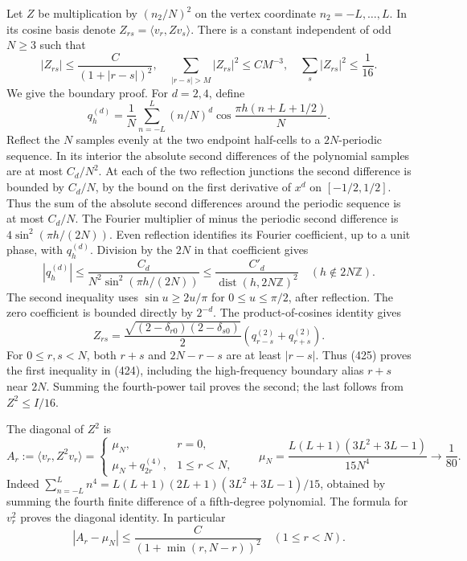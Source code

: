 \documentclass[
  11pt,
]{article}
\begin{document}
Let \(Z\) be multiplication by \((n_2/N)^2\) on the vertex coordinate
\(n_2=-L,\ldots,L\). In its cosine basis denote
\(Z_{rs}=\langle v_r,Zv_s\rangle\). There is a constant independent of
odd \(N\ge3\) such that \[
 |Z_{rs}|\le\frac{C}{(1+|r-s|)^2},
 \quad \sum_{|r-s|>M}|Z_{rs}|^2\le CM^{-3},
 \quad \sum_s|Z_{rs}|^2\le\frac1{16}.
 \tag{424}
\] We give the boundary proof. For \(d=2,4\), define \[
 q^{(d)}_h=\frac1N\sum_{n=-L}^L
       (n/N)^d\cos\frac{\pi h(n+L+1/2)}N .
\] Reflect the \(N\) samples evenly at the two endpoint half-cells to a
\(2N\)-periodic sequence. In its interior the absolute second
differences of the polynomial samples are at most \(C_d/N^2\). At each
of the two reflection junctions the second difference is bounded by
\(C_d/N\), by the bound on the first derivative of \(x^d\) on
\([-1/2,1/2]\). Thus the sum of the absolute second differences around
the periodic sequence is at most \(C_d/N\). The Fourier multiplier of
minus the periodic second difference is \(4\sin^2(\pi h/(2N))\). Even
reflection identifies its Fourier coefficient, up to a unit phase, with
\(q^{(d)}_h\). Division by the \(2N\) in that coefficient gives \[
 |q^{(d)}_h|\le
 \frac{C_d}{N^2\sin^2(\pi h/(2N))}
 \le\frac{C'_d}{\operatorname{dist}(h,2N\mathbb Z)^2}
 \quad(h\notin2N\mathbb Z).
 \tag{425}
\] The second inequality uses \(\sin u\ge 2u/\pi\) for
\(0\le u\le\pi/2\), after reflection. The zero coefficient is bounded
directly by \(2^{-d}\). The product-of-cosines identity gives \[
 Z_{rs}=\frac{\sqrt{(2-\delta_{r0})(2-\delta_{s0})}}2
                  (q^{(2)}_{r-s}+q^{(2)}_{r+s}).
 \tag{426}
\] For \(0\le r,s<N\), both \(r+s\) and \(2N-r-s\) are at least
\(|r-s|\). Thus (425) proves the first inequality in (424), including
the high-frequency boundary alias \(r+s\) near \(2N\). Summing the
fourth-power tail proves the second; the last follows from
\(Z^2\le I/16\).

The diagonal of \(Z^2\) is \[
 A_r:=\langle v_r,Z^2v_r\rangle
 =\begin{cases}\mu_N,&r=0,\\
 \mu_N+q^{(4)}_{2r},&1\le r<N,\end{cases}
 \qquad
 \mu_N=\frac{L(L+1)(3L^2+3L-1)}{15N^4}
                 \longrightarrow\frac1{80}.
 \tag{427}
\] Indeed \(\sum_{n=-L}^Ln^4=L(L+1)(2L+1)(3L^2+3L-1)/15\), obtained by
summing the fourth finite difference of a fifth-degree polynomial. The
formula for \(v_r^2\) proves the diagonal identity. In particular \[
 |A_r-\mu_N|\le
 \frac{C}{(1+\min(r,N-r))^2}\quad(1\le r<N).
 \tag{428}
\]
\end{document}
